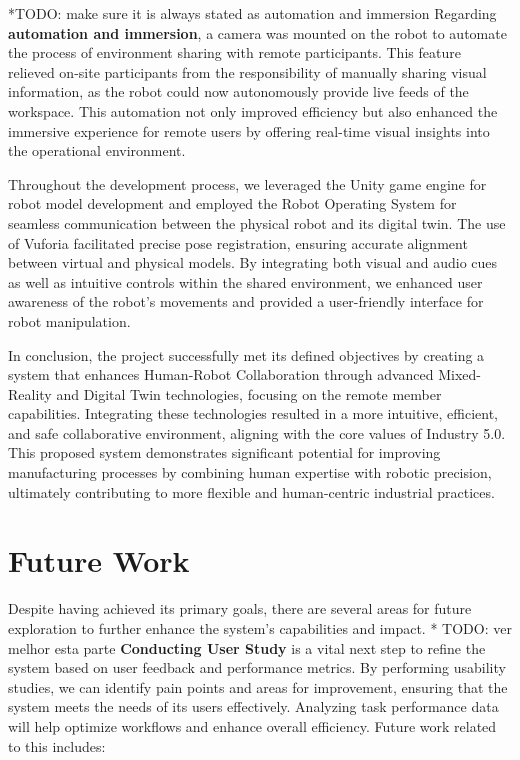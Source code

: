 *TODO: make sure it is always stated as automation and immersion
Regarding \textbf{automation and immersion}, a camera was mounted on the robot to automate the process of environment sharing with remote participants. This feature relieved on-site participants from the responsibility of manually sharing visual information, as the robot could now autonomously provide live feeds of the workspace. This automation not only improved efficiency but also enhanced the immersive experience for remote users by offering real-time visual insights into the operational environment.

Throughout the development process, we leveraged the Unity game engine for robot model development and employed the Robot Operating System for seamless communication between the physical robot and its digital twin. The use of Vuforia facilitated precise pose registration, ensuring accurate alignment between virtual and physical models. By integrating both visual and audio cues as well as intuitive controls within the shared environment, we enhanced user awareness of the robot's movements and provided a user-friendly interface for robot manipulation.


In conclusion, the project successfully met its defined objectives by creating a system that enhances Human-Robot Collaboration through advanced Mixed-Reality and Digital Twin technologies, focusing on the remote member capabilities. Integrating these technologies resulted in a more intuitive, efficient, and safe collaborative environment, aligning with the core values of Industry 5.0. This proposed system demonstrates significant potential for improving manufacturing processes by combining human expertise with robotic precision, ultimately contributing to more flexible and human-centric industrial practices.

\section{Future Work}

Despite having achieved its primary goals, there are several areas for future exploration to further enhance the system's capabilities and impact.
* TODO: ver melhor esta parte
\textbf{Conducting User Study} is a vital next step to refine the system based on user feedback and performance metrics. By performing usability studies, we can identify pain points and areas for improvement, ensuring that the system meets the needs of its users effectively. Analyzing task performance data will help optimize workflows and enhance overall efficiency.
Future work related to this includes:

